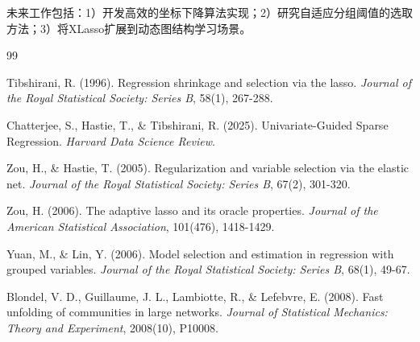 \documentclass[12pt,a4paper]{article}
\begin{document}
未来工作包括：1）开发高效的坐标下降算法实现；2）研究自适应分组阈值的选取方法；3）将XLasso扩展到动态图结构学习场景。

\begin{thebibliography}{99}

Tibshirani, R. (1996). Regression shrinkage and selection via the lasso. \textit{Journal of the Royal Statistical Society: Series B}, 58(1), 267-288.

Chatterjee, S., Hastie, T., \& Tibshirani, R. (2025). Univariate-Guided Sparse Regression. \textit{Harvard Data Science Review}.

Zou, H., \& Hastie, T. (2005). Regularization and variable selection via the elastic net. \textit{Journal of the Royal Statistical Society: Series B}, 67(2), 301-320.

Zou, H. (2006). The adaptive lasso and its oracle properties. \textit{Journal of the American Statistical Association}, 101(476), 1418-1429.

Yuan, M., \& Lin, Y. (2006). Model selection and estimation in regression with grouped variables. \textit{Journal of the Royal Statistical Society: Series B}, 68(1), 49-67.

Blondel, V. D., Guillaume, J. L., Lambiotte, R., \& Lefebvre, E. (2008). Fast unfolding of communities in large networks. \textit{Journal of Statistical Mechanics: Theory and Experiment}, 2008(10), P10008.

\end{thebibliography}
\end{document}
